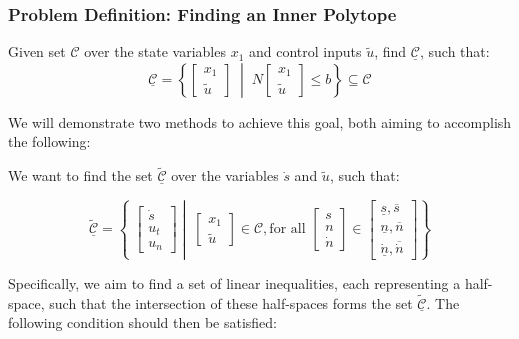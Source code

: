 \subsubsection{Problem Definition: Finding an Inner Polytope}
\label{problem:inner_polytope}
Given set $\mathcal{C}$ over the state variables $x_1$ and control inputs $\tilde{u}$, find $\underline{\mathcal{C}}$, such that:
\begin{equation}
	\underline{\mathcal{C}} = \left\{ \begin{bmatrix}
		x_1 \\ \tilde{u} \end{bmatrix} \; \middle|\;
	N \begin{bmatrix}
		x_1 \\ \tilde{u} \end{bmatrix} \leq b
	\right\} \subseteq \mathcal{C}
\end{equation}

We will demonstrate two methods to achieve this goal, both aiming to accomplish the following:

We want to find the set $\tilde{\underline{\mathcal{C}}}$ over the variables $\dot{s}$ and $\tilde{u}$, such that:

\begin{equation}
	\tilde{\underline{\mathcal{C}}} =
	\left\{ \;
	\begin{bmatrix}
		\dot{s} \\
		u_t     \\
		u_n
	\end{bmatrix}
	\middle|\;
	\begin{bmatrix}
		x_1 \\ \tilde{u}
	\end{bmatrix} \in \mathcal{C}, \text{for all } \begin{bmatrix}
		s \\
		n \\
		\dot{n}
	\end{bmatrix} \in \begin{bmatrix}
		\underline{s}, \overline{s} \\
		\underline{n}, \overline{n} \\
		\underline{\dot{n}},  \overline{\dot{n}}
	\end{bmatrix}
	\right\}
\end{equation}

Specifically, we aim to find a set of linear inequalities, each representing a half-space, such that the intersection of these half-spaces forms the
set $\tilde{\underline{\mathcal{C}}}$.
The following condition should then be satisfied:

